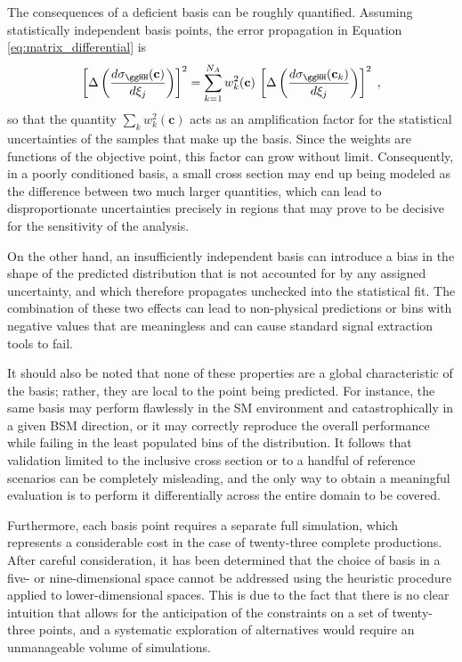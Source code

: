 The consequences of a deficient basis can be roughly quantified. Assuming statistically independent basis points, the error propagation in Equation \ref{eq:matrix_differential} is
%
$$
    \left[\Delta\left(\frac{d\sigma_{\ggHH}(\mathbf{c})}{d\xi_j}\right)\right]^{2}
    = \sum_{k=1}^{N_A} w_k^{2}(\mathbf{c})\,
      \left[\Delta\left(\frac{d\sigma_{\ggHH}(\mathbf{c}_k)}{d\xi_j}\right)\right]^{2}\;,
$$
%
so that the quantity $\sum_k w_k^{2}(\mathbf{c})$ acts as an amplification factor for the statistical uncertainties of the samples that make up the basis. Since the weights are functions of the objective point, this factor can grow without limit. Consequently, in a poorly conditioned basis, a small cross section may end up being modeled as the difference between two much larger quantities, which can lead to disproportionate uncertainties precisely in regions that may prove to be decisive for the sensitivity of the analysis.

On the other hand, an insufficiently independent basis can introduce a bias in the shape of the predicted distribution that is not accounted for by any assigned uncertainty, and which therefore propagates unchecked into the statistical fit. The combination of these two effects can lead to non-physical predictions or bins with negative values that are meaningless and can cause standard signal extraction tools to fail.

It should also be noted that none of these properties are a global characteristic of the basis; rather, they are local to the point being predicted. For instance, the same basis may perform flawlessly in the SM environment and catastrophically in a given BSM direction, or it may correctly reproduce the overall performance while failing in the least populated bins of the distribution. It follows that validation limited to the inclusive cross section or to a handful of reference scenarios can be completely misleading, and the only way to obtain a meaningful evaluation is to perform it differentially across the entire domain to be covered.

Furthermore, each basis point requires a separate full simulation, which represents a considerable cost in the case of twenty-three complete productions. After careful consideration, it has been determined that the choice of basis in a five- or nine-dimensional space cannot be addressed using the heuristic procedure applied to lower-dimensional spaces. This is due to the fact that there is no clear intuition that allows for the anticipation of the constraints on a set of twenty-three points, and a systematic exploration of alternatives would require an unmanageable volume of simulations.\\

